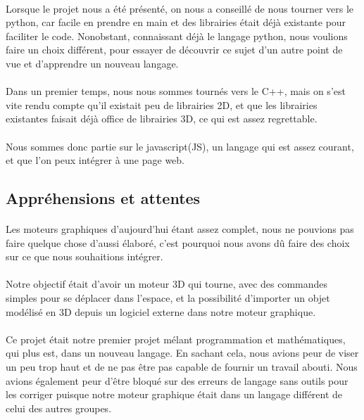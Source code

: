 \paragraph{}
Lorsque le projet nous a été présenté, on nous a conseillé de nous tourner vers le python, car facile en prendre en main et des librairies était déjà existante pour faciliter le code. Nonobstant, connaissant déjà le langage python, nous voulions faire un choix différent, pour essayer de découvrir ce sujet d'un autre point de vue et d'apprendre un nouveau langage.

\paragraph{}
Dans un premier temps, nous nous sommes tournés vers le C++, mais on s'est vite rendu compte qu'il existait peu de librairies 2D, et que les librairies existantes faisait déjà office de librairies 3D, ce qui est assez regrettable.

\paragraph{}
Nous sommes donc partie sur le javascript(JS), un langage qui est assez courant, et que l'on peux intégrer à une page web.

\subsection{Appréhensions et attentes}
\paragraph{}
Les moteurs graphiques d'aujourd'hui étant assez complet, nous ne pouvions pas faire quelque chose d'aussi élaboré, c'est pourquoi nous avons dû faire des choix sur ce que nous souhaitions intégrer.

\paragraph{}
Notre objectif était d'avoir un moteur 3D qui tourne, avec des commandes simples pour se déplacer dans l'espace, et la possibilité d'importer un objet modélisé en 3D depuis un logiciel externe dans notre moteur graphique.

\paragraph{}
Ce projet était notre premier projet mélant programmation et mathématiques, qui plus est, dans un nouveau langage.
En sachant cela, nous avions peur de viser un peu trop haut et de ne pas être pas capable de fournir un travail abouti. Nous avions également peur d'être bloqué sur des erreurs de langage sans outils pour les corriger puisque notre moteur graphique était dans un langage différent de celui des autres groupes.

